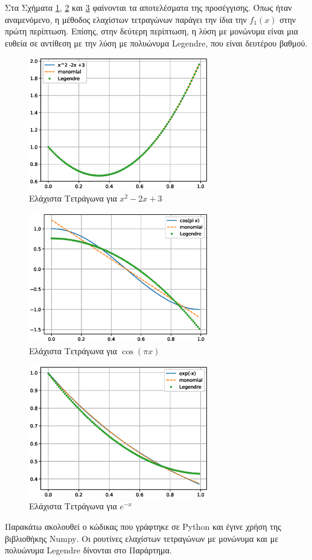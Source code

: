 \documentclass[assignment3.tex]{subfiles}
\begin{document}
Στα Σχήματα \ref{fig:lsquares_1}, \ref{fig:lsquares_2} και \ref{fig:lsquares_3} φαίνονται τα αποτελέσματα της προσέγγισης. Όπως ήταν αναμενόμενο, η μέθοδος ελαχίστων τετραγώνων παράγει την ίδια την $f_1(x)$ στην πρώτη περίπτωση. Επίσης, στην δεύτερη περίπτωση, η λύση με μονώνυμα είναι μια ευθεία σε αντίθεση με την λύση με πολυώνυμα \textlatin{Legendre}, που είναι δευτέρου βαθμού.

\begin{figure}[hp]
\includegraphics[width=0.7\textwidth]{lsquares_1.eps}
\centering
\caption{Ελάχιστα Τετράγωνα για $x^2-2x+3$}
\label{fig:lsquares_1}
\end{figure}

\begin{figure}[hp]
\includegraphics[width=0.7\textwidth]{lsquares_2.eps}
\centering
\caption{Ελάχιστα Τετράγωνα για $\cos(\pi x)$}
\label{fig:lsquares_2}
\end{figure}

\begin{figure}[hp]
\includegraphics[width=0.7\textwidth]{lsquares_3.eps}
\centering
\caption{Ελάχιστα Τετράγωνα για $e^{-x}$}
\label{fig:lsquares_3}
\end{figure}

Παρακάτω ακολουθεί ο κώδικας που γράφτηκε σε \textlatin{Python} και έγινε χρήση της βιβλιοθήκης \textlatin{Numpy}. Οι ρουτίνες ελαχίστων τετραγώνων με μονώνυμα και με πολυώνυμα \textlatin{Legendre} δίνονται στο Παράρτημα.

\end{document}
